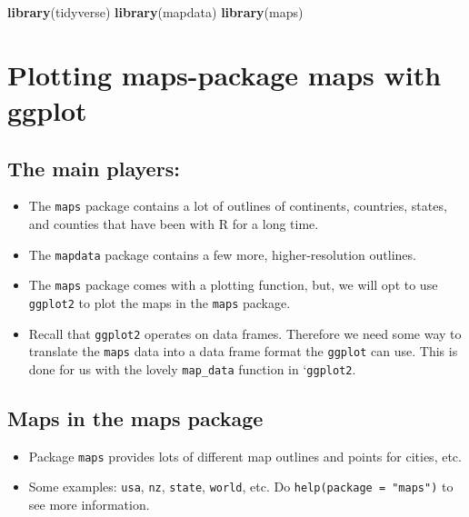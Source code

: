 \documentclass[]{book}
\newenvironment{Shaded}{\begin{snugshade}}{\end{snugshade}}
\newcommand{\KeywordTok}[1]{\textcolor[rgb]{0.13,0.29,0.53}{\textbf{{#1}}}}
\newcommand{\NormalTok}[1]{{#1}}
\providecommand{\tightlist}{%
  \setlength{\itemsep}{0pt}\setlength{\parskip}{0pt}}
\theoremstyle{definition}
\theoremstyle{definition}
\theoremstyle{remark}
\begin{document}
\begin{Shaded}
\begin{Highlighting}[]
\KeywordTok{library}\NormalTok{(tidyverse)}
\KeywordTok{library}\NormalTok{(mapdata)}
\KeywordTok{library}\NormalTok{(maps)}
\end{Highlighting}
\end{Shaded}

\section{Plotting maps-package maps with
ggplot}\label{maps-package-and-ggplot}

\subsection{The main players:}\label{the-main-players}

\begin{itemize}
\tightlist
\item
  The \texttt{maps} package contains a lot of outlines of continents,
  countries, states, and counties that have been with R for a long
  time.\\
\item
  The \texttt{mapdata} package contains a few more, higher-resolution
  outlines.
\item
  The \texttt{maps} package comes with a plotting function, but, we will
  opt to use \texttt{ggplot2} to plot the maps in the \texttt{maps}
  package.\\
\item
  Recall that \texttt{ggplot2} operates on data frames. Therefore we
  need some way to translate the \texttt{maps} data into a data frame
  format the \texttt{ggplot} can use. This is done for us with the
  lovely \texttt{map\_data} function in `\texttt{ggplot2}.
\end{itemize}

\subsection{Maps in the maps package}\label{maps-in-the-maps-package}

\begin{itemize}
\tightlist
\item
  Package \texttt{maps} provides lots of different map outlines and
  points for cities, etc.\\
\item
  Some examples: \texttt{usa}, \texttt{nz}, \texttt{state},
  \texttt{world}, etc. Do \texttt{help(package\ =\ "maps")} to see more
  information.
\end{itemize}
\end{document}
